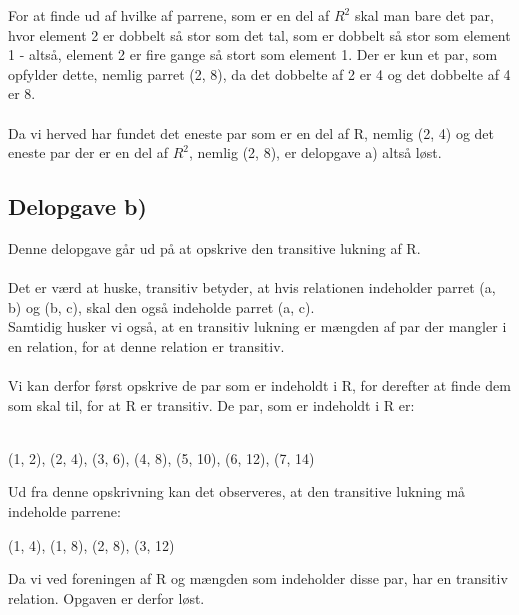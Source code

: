 \documentclass{article}
\begin{document}
For at finde ud af hvilke af parrene, som er en del af $R^2$ skal man bare det par, hvor element 2 er dobbelt så stor som det tal, som er dobbelt så stor som element 1 - altså, element 2 er fire gange så stort som element 1. Der er kun et par, som opfylder dette, nemlig parret (2, 8), da det dobbelte af 2 er 4 og det dobbelte af 4 er 8. \\ \\

Da vi herved har fundet det eneste par som er en del af R, nemlig (2, 4) og det eneste par der er en del af $R^2$, nemlig (2, 8), er delopgave a) altså løst.

\subsection{Delopgave b)}
Denne delopgave går ud på at opskrive den transitive lukning af R. \\ \\

Det er værd at huske, transitiv betyder, at hvis relationen indeholder parret (a, b) og (b, c), skal den også indeholde parret (a, c). \\ Samtidig husker vi også, at en transitiv lukning er mængden af par der mangler i en relation, for at denne relation er transitiv. \\ \\

Vi kan derfor først opskrive de par som er indeholdt i R, for derefter at finde dem som skal til, for at R er transitiv. De par, som er indeholdt i R er: \\ \\

\begin{center}
    (1, 2), (2, 4), (3, 6), (4, 8), (5, 10), (6, 12), (7, 14)
\end{center}

Ud fra denne opskrivning kan det observeres, at den transitive lukning må indeholde parrene:

\begin{center}
    (1, 4), (1, 8), (2, 8), (3, 12)
\end{center}

Da vi ved foreningen af R og mængden som indeholder disse par, har en transitiv relation. Opgaven er derfor løst.
\end{document}
